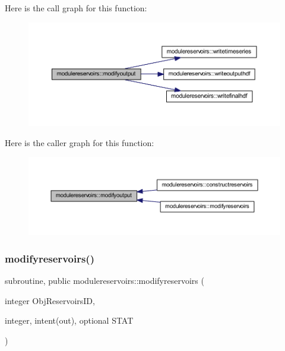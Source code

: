 Here is the call graph for this function\+:\nopagebreak
\begin{figure}[H]
\begin{center}
\leavevmode
\includegraphics[width=350pt]{namespacemodulereservoirs_a72a469df722e5436ce882168e7d1c0bb_cgraph}
\end{center}
\end{figure}
Here is the caller graph for this function\+:\nopagebreak
\begin{figure}[H]
\begin{center}
\leavevmode
\includegraphics[width=350pt]{namespacemodulereservoirs_a72a469df722e5436ce882168e7d1c0bb_icgraph}
\end{center}
\end{figure}
\mbox{\label{namespacemodulereservoirs_a65da9561acff8444f90db1ccde975201}} 
\subsubsection{\texorpdfstring{modifyreservoirs()}{modifyreservoirs()}}
{\footnotesize\ttfamily subroutine, public modulereservoirs\+::modifyreservoirs (\begin{DoxyParamCaption}\item[{integer}]{Obj\+Reservoirs\+ID,  }\item[{integer, intent(out), optional}]{S\+T\+AT }\end{DoxyParamCaption})}

